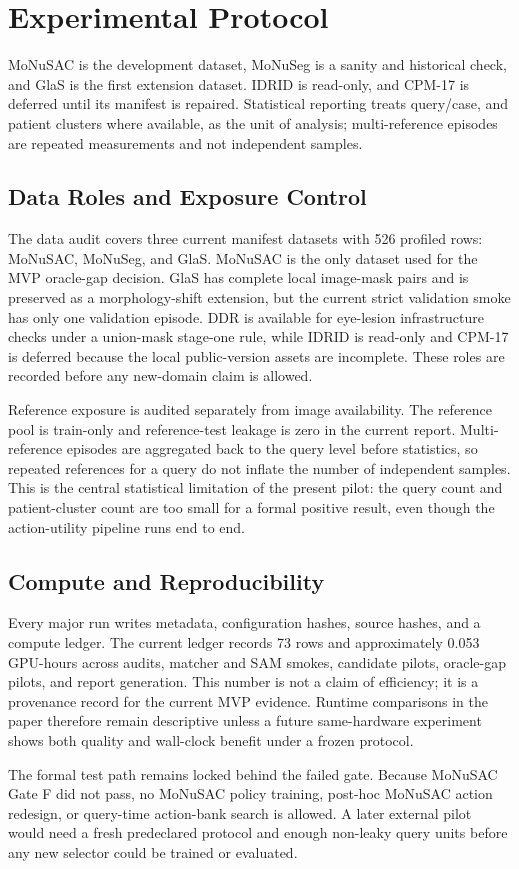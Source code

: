 \section{Experimental Protocol}
MoNuSAC is the development dataset, MoNuSeg is a sanity and historical check, and GlaS is the first extension dataset. IDRID is read-only, and CPM-17 is deferred until its manifest is repaired. Statistical reporting treats query/case, and patient clusters where available, as the unit of analysis; multi-reference episodes are repeated measurements and not independent samples.

\subsection{Data Roles and Exposure Control}
The data audit covers three current manifest datasets with 526 profiled rows: MoNuSAC, MoNuSeg, and GlaS. MoNuSAC is the only dataset used for the MVP oracle-gap decision. GlaS has complete local image-mask pairs and is preserved as a morphology-shift extension, but the current strict validation smoke has only one validation episode. DDR is available for eye-lesion infrastructure checks under a union-mask stage-one rule, while IDRID is read-only and CPM-17 is deferred because the local public-version assets are incomplete. These roles are recorded before any new-domain claim is allowed.

Reference exposure is audited separately from image availability. The reference pool is train-only and reference-test leakage is zero in the current report. Multi-reference episodes are aggregated back to the query level before statistics, so repeated references for a query do not inflate the number of independent samples. This is the central statistical limitation of the present pilot: the query count and patient-cluster count are too small for a formal positive result, even though the action-utility pipeline runs end to end.

\subsection{Compute and Reproducibility}
Every major run writes metadata, configuration hashes, source hashes, and a compute ledger. The current ledger records 73 rows and approximately 0.053 GPU-hours across audits, matcher and SAM smokes, candidate pilots, oracle-gap pilots, and report generation. This number is not a claim of efficiency; it is a provenance record for the current MVP evidence. Runtime comparisons in the paper therefore remain descriptive unless a future same-hardware experiment shows both quality and wall-clock benefit under a frozen protocol.

The formal test path remains locked behind the failed gate. Because MoNuSAC Gate F did not pass, no MoNuSAC policy training, post-hoc MoNuSAC action redesign, or query-time action-bank search is allowed. A later external pilot would need a fresh predeclared protocol and enough non-leaky query units before any new selector could be trained or evaluated.
